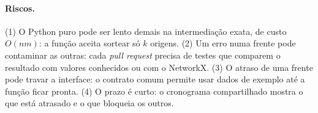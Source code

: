 \paragraph{Riscos.} (1) O Python puro pode ser lento demais na intermediação exata, de custo $O(nm)$:
a função aceita sortear só $k$ origens. (2) Um erro numa frente pode contaminar as outras: cada
\emph{pull request} precisa de testes que comparem o resultado com valores conhecidos ou com o
NetworkX. (3) O atraso de uma frente pode travar a interface: o contrato comum permite usar dados de
exemplo até a função ficar pronta. (4) O prazo é curto: o cronograma compartilhado mostra o que está
atrasado e o que bloqueia os outros.
